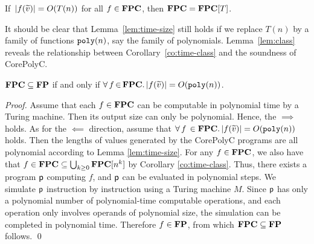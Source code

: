 \documentclass[runningheads]{llncs}
\begin{document}
\begin{corollary}
\label{co:time-class}
If $\,\vert f(\widetilde{v})\vert=O(T(n))$ for all $f\in\mathbf{FPC}$, then $\mathbf{FPC}=\mathbf{FPC}[T]$.
\end{corollary}

It should be clear that Lemma~\ref{lem:time-size} still holds if we replace $T(n)$ by a family of functions $\mathtt{poly}(n)$, say the family of polynomials.
Lemma~\ref{lem:class} reveals the relationship between Corollary~\ref{co:time-class} and the soundness of CorePolyC.

\begin{lemma}\label{lem:class}
$\mathbf{FPC}\subseteq \mathbf{FP}$ if and only if $\forall\,f\,{\in}\,\mathbf{FPC}.\,\vert f(\widetilde{v})\vert=O(\mathtt{poly}(n))$.
\end{lemma}
\begin{proof}
Assume that each $f\in\mathbf{FPC}$ can be computable in polynomial time by a Turing machine.
Then its output size can only be polynomial.
Hence, the $\implies$ holds.
As for the $\impliedby$ direction, assume that $\forall\,{f}\,\in\mathbf{FPC}.\,\vert f(\widetilde{v})\vert=O(\mathtt{poly}(n))$ holds.
Then the lengths of values generated by the CorePolyC programs are all polynomial according to Lemma \ref{lem:time-size}.
For any $f\in\mathbf{FPC}$, we also have that $f\in\mathbf{FPC}\subseteq\bigcup_{k\ge0}\mathbf{FPC}{[n^{k}]}$ by Corollary \ref{co:time-class}.
Thus, there exists a program $\mathsf{p}$ computing $f$, and $\mathsf{p}$ can be evaluated in polynomial steps.
We simulate $\mathsf{p}$ instruction by instruction using a Turing machine $M$. Since $\mathsf{p}$ has only a polynomial number of polynomial-time computable operations, and each operation only involves operands of polynomial size, the simulation can be completed in polynomial time.
Therefore $f\in\mathbf{FP}$, from which $\mathbf{FPC}\subseteq\mathbf{FP}$ follows.
\qed
\end{proof}
\end{document}
